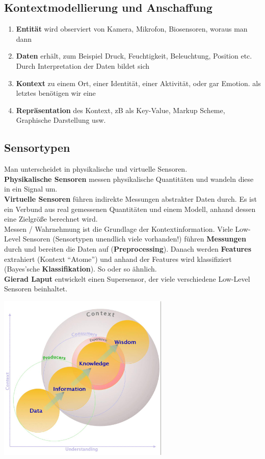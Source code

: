 \documentclass[a4paper]{article}
\begin{document}
\subsection{Kontextmodellierung und Anschaffung}
\begin{enumerate}
	\item \textbf{Entität} wird observiert von Kamera, Mikrofon, Biosensoren, woraus man dann
	\item \textbf{Daten} erhält, zum Beispiel Druck, Feuchtigkeit, Beleuchtung, Position etc. Durch Interpretation der Daten bildet sich
	\item \textbf{Kontext} zu einem Ort, einer Identität, einer Aktivität, oder gar Emotion. als letztes benötigen wir eine
	\item \textbf{Repräsentation} des Kontext, zB als Key-Value, Markup Scheme, Graphische Darstellung usw.
\end{enumerate}
\subsection{Sensortypen}
Man unterscheidet in {physikalische} und {virtuelle} Sensoren.\\

\textbf{Physikalische Sensoren} messen physikalische Quantitäten und wandeln diese in ein Signal um.\\
\textbf{Virtuelle Sensoren} führen indirekte Messungen abstrakter Daten durch. Es ist ein Verbund aus real gemessenen Quantitäten und einem Modell, anhand dessen eine Zielgröße berechnet wird.\\

Messen / Wahrnehmung ist die Grundlage der Kontextinformation. Viele Low-Level Sensoren (Sensortypen unendlich viele vorhanden!) führen \textbf{Messungen} durch und bereiten die Daten auf (\textbf{Preprocessing}). Danach werden \textbf{Features} extrahiert (Kontext ``Atome'') und anhand der Features wird klassifiziert (Bayes'sche \textbf{Klassifikation}). So oder so ähnlich.\\

\textbf{Gierad Laput} entwickelt einen Supersensor, der viele verschiedene Low-Level Sensoren beinhaltet. \\

\begin{center}
	\includegraphics[height = 8cm]{Kontext.png}
\end{center}
\newpage
\end{document}
